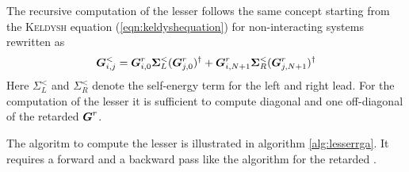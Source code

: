 The recursive computation of the lesser \gfnc{} follows the same concept starting from the \textsc{Keldysh} equation (\ref{eqn:keldyshequation}) for non-interacting systems rewritten as
\begin{align}
\boldsymbol{G}^<_{i,j} = \boldsymbol{G}^r_{i,0}\boldsymbol{\Sigma}^<_L(\boldsymbol{G}^r_{j,0})^{\dagger}+\boldsymbol{G}^r_{i,N+1}\boldsymbol{\Sigma}^<_R(\boldsymbol{G}^r_{j,N+1})^{\dagger}
\end{align}
Here $\Sigma^<_L$ and $\Sigma^<_R$ denote the self-energy term  for the left and right lead. For the computation of the lesser \gfnc{} it is sufficient to compute diagonal and one off-diagonal of the retarded \gfnc{} $\boldsymbol{G}^r$.\par
The algoritm to compute the lesser \gfnc{} is illustrated in algorithm \ref{alg:lesserrga}. It requires a forward and a backward pass like the algorithm for the retarded \gfnc{}.\par
